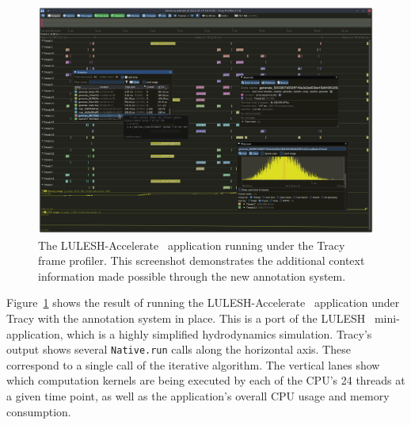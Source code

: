 \documentclass[fontsize=11pt,a4paper,parskip=half,numbers=noenddot]{scrartcl}
\begin{document}
\begin{figure}[t]
  \centering
  \def\svgwidth{\linewidth}
  \includegraphics[width=\linewidth]{assets/tracy-lulesh-annotated.png}
  \caption{The LULESH-Accelerate~\cite{lulesh-accelerate} application running under the Tracy frame profiler. This screenshot demonstrates the additional context information made possible through the new annotation system.}\label{fig:tracy-lulesh-annotated}
\end{figure}

Figure~\ref{fig:tracy-lulesh-annotated} shows the result of running the
LULESH-Accelerate~\cite{lulesh-accelerate} application under Tracy with the
annotation system in place. This is a port of the LULESH~\cite{karlin2013lulesh}
mini-application, which is a highly simplified hydrodynamics simulation. Tracy's
output shows several \texttt{Native.run} calls along the horizontal axis. These
correspond to a single call of the iterative algorithm. The vertical lanes show
which computation kernels are being executed by each of the CPU's 24 threads at
a given time point, as well as the application's overall CPU usage and memory
consumption.
\end{document}
